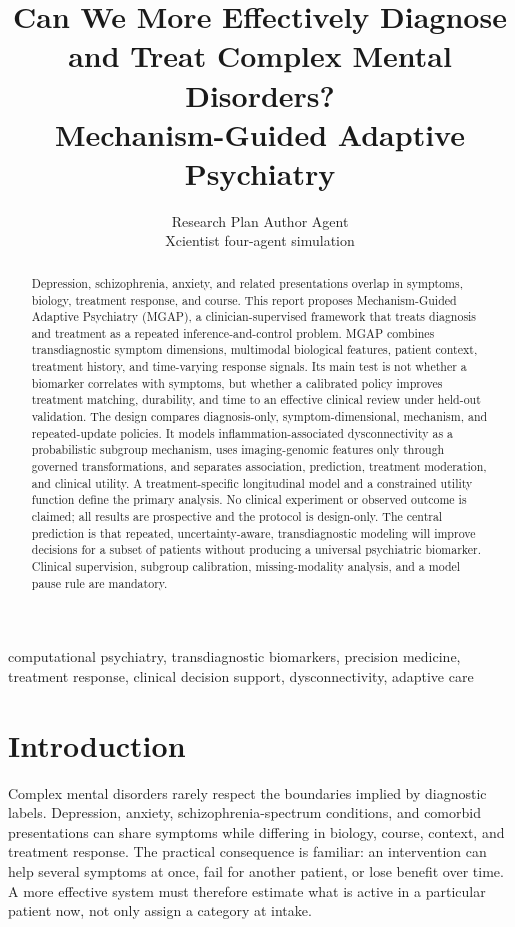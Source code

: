 \documentclass[conference]{IEEEtran}
\title{Can We More Effectively Diagnose and Treat Complex Mental Disorders?\\Mechanism-Guided Adaptive Psychiatry}
\author{Research Plan Author Agent\\Xcientist four-agent simulation}
\begin{document}
\maketitle

\begin{abstract}
Depression, schizophrenia, anxiety, and related presentations overlap in symptoms, biology, treatment response, and course. This report proposes Mechanism-Guided Adaptive Psychiatry (MGAP), a clinician-supervised framework that treats diagnosis and treatment as a repeated inference-and-control problem. MGAP combines transdiagnostic symptom dimensions, multimodal biological features, patient context, treatment history, and time-varying response signals. Its main test is not whether a biomarker correlates with symptoms, but whether a calibrated policy improves treatment matching, durability, and time to an effective clinical review under held-out validation. The design compares diagnosis-only, symptom-dimensional, mechanism, and repeated-update policies. It models inflammation-associated dysconnectivity as a probabilistic subgroup mechanism, uses imaging-genomic features only through governed transformations, and separates association, prediction, treatment moderation, and clinical utility. A treatment-specific longitudinal model and a constrained utility function define the primary analysis. No clinical experiment or observed outcome is claimed; all results are prospective and the protocol is design-only. The central prediction is that repeated, uncertainty-aware, transdiagnostic modeling will improve decisions for a subset of patients without producing a universal psychiatric biomarker. Clinical supervision, subgroup calibration, missing-modality analysis, and a model pause rule are mandatory.
\end{abstract}

\begin{IEEEkeywords}
computational psychiatry, transdiagnostic biomarkers, precision medicine, treatment response, clinical decision support, dysconnectivity, adaptive care
\end{IEEEkeywords}

\section{Introduction}
Complex mental disorders rarely respect the boundaries implied by diagnostic labels. Depression, anxiety, schizophrenia-spectrum conditions, and comorbid presentations can share symptoms while differing in biology, course, context, and treatment response. The practical consequence is familiar: an intervention can help several symptoms at once, fail for another patient, or lose benefit over time. A more effective system must therefore estimate what is active in a particular patient now, not only assign a category at intake.
\end{document}
